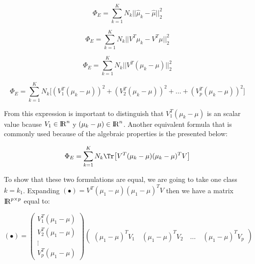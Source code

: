 \begin{equation*}
\Phi_E = \sum\limits_{k = 1}^{K} N_{k} ||\widehat{\mu}_k - \widehat{\mu}||_2^2
\end{equation*}

\begin{equation*}
\Phi_E = \sum\limits_{k = 1}^{K} N_{k} ||V^T \mu_k - V^T \mu||_2^2
\end{equation*}

\begin{equation*}
\Phi_E = \sum\limits_{k = 1}^{K} N_{k} ||V^T (\mu_k - \mu)||_2^2
\end{equation*}


\begin{equation}\label{eq:2.17}
  \Phi_E = \sum\limits_{k = 1}^{K} N_{k} \big[ (V_1^T (\mu_k - \mu))^2 + (V_2^T (\mu_k - \mu))^2+ ... + (V_p^T (\mu_k - \mu))^2 \big]
\end{equation}

From this expression is important to distinguish that $V_1^T (\mu_k - \mu)$ is an scalar value bcause $V_1 \in {\rm I\!R}^n$ y $(\mu_k - \mu) \in {\rm I\!R}^{n}$. Another equivalent formula that is commonly used because of the algebraic properties is the presented below:

\begin{equation}\label{eq:2.18}
\Phi_E = \sum\limits_{k = 1}^{K} N_{k} \Tr \big[ V^T (\mu_k - \mu) (\mu_k - \mu)^T V \big]	
\end{equation}

To show that these two formulations are equal, we are going to take one class $k = k_1$. Expanding $(\bullet) = V^T (\mu_1 - \mu) (\mu_1 - \mu)^T V$ then we have a matrix ${\rm I\!R}^{p \times p}$ equal to:


\begin{equation*}
(\bullet)= \left(\!
    \begin{array}{c}
      V_1^T (\mu_1-\mu)\\
      V_2^T (\mu_1-\mu)\\
      \vdots \\
      V_p^T (\mu_1-\mu)
    \end{array}
  \!\right) 
  \left(\!\begin{array}{c}
      (\mu_1-\mu)^T V_1 \quad
      (\mu_1-\mu)^T V_2 \quad
      \hdots \quad
      (\mu_1-\mu)^T V_p
    \end{array}
  \!\right) 
\end{equation*} 

\vspace{5mm}

